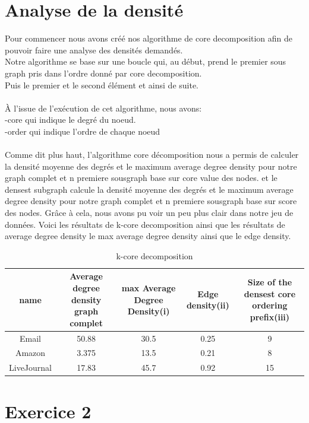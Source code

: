 \documentclass[a4paper,10pt]{report}
\begin{document}
\section{Analyse de la densité}
Pour commencer nous avons créé nos algorithme de core decomposition afin de pouvoir faire une analyse des densités demandés.
\\
Notre algorithme se base sur une boucle qui, au début, prend le premier sous graph pris dans l'ordre donné par core decomposition.\\
Puis le premier et le second élément et ainsi de suite.
\\
\\
À l'issue de l'exécution de cet algorithme, nous avons:\\
\indent -core qui indique le degré du noeud.\\
\indent -order qui indique l'ordre de chaque noeud
        \\
        \\
Comme dit plus haut, l'algorithme core décomposition nous a permis de calculer la densité moyenne des degrés et le maximum average degree density pour notre graph complet et n premiere sousgraph base sur core value des nodes. et le densest subgraph calcule la densité moyenne des degrés et le maximum average degree density pour notre graph complet et n premiere sousgraph base sur score des nodes.
Grâce à cela, nous avons pu voir un peu plus clair dans notre jeu de données.
\clearpage
Voici les résultats de k-core decomposition ainsi que les résultats de average degree density le max average degree density ainsi que le edge density.
\begin{table}[ht]
\caption{k-core decomposition}
\centering
\begin{tabular}{|c c c c c|}
\hline\hline
name & Average degree density graph complet & max Average Degree Density(i) & Edge density(ii) & Size of the densest core ordering prefix(iii) \\[0.5ex]
\hline

Email & 50.88 & 30.5 & 0.25 & 9 \\
Amazon & 3.375 & 13.5 & 0.21 & 8 \\
LiveJournal & 17.83 & 45.7 & 0.92 & 15  \\

\hline
\end{tabular}
\label {table:nonlin}
\end{table}

\section{Exercice 2}
\end{document}

